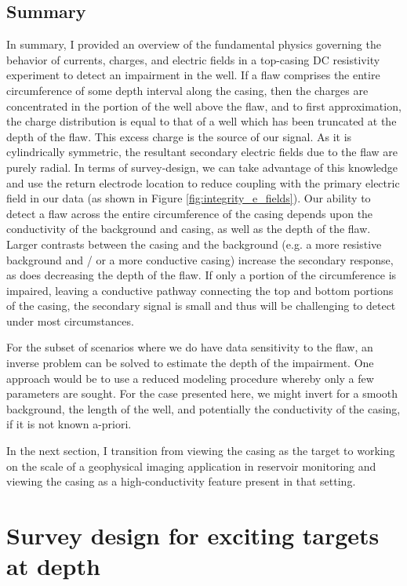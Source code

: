 

\subsection{Summary}
In summary, I provided an overview of the fundamental physics governing the behavior of currents, charges, and electric fields in a top-casing DC resistivity experiment to detect an impairment in the well. If a flaw comprises the entire circumference of some depth interval along the casing, then the charges are concentrated in the portion of the well above the flaw, and to first approximation, the charge distribution is equal to that of a well which has been truncated at the depth of the flaw. This excess charge is the source of our signal. As it is cylindrically symmetric, the resultant secondary electric fields due to the flaw are purely radial. In terms of survey-design, we can take advantage of this knowledge and use the return electrode location to reduce coupling with the primary electric field in our data (as shown in Figure \ref{fig:integrity_e_fields}). Our ability to detect a flaw across the entire circumference of the casing depends upon the conductivity of the background and casing, as well as the depth of the flaw. Larger contrasts between the casing and the background (e.g. a more resistive background and / or a more conductive casing) increase the secondary response, as does decreasing the depth of the flaw. If only a portion of the circumference is impaired, leaving a conductive pathway connecting the top and bottom portions of the casing, the secondary signal is small and thus will be challenging to detect under most circumstances.

For the subset of scenarios where we do have data sensitivity to the flaw, an inverse problem can be solved to  estimate the depth of the impairment. One approach would be to use a reduced modeling procedure whereby only a few parameters are sought. For the case presented here, we might invert for a smooth background, the length of the well, and potentially the conductivity of the casing, if it is not known a-priori.

In the next section, I transition from viewing the casing as the target to working on the scale of a geophysical imaging application in reservoir monitoring and viewing the casing as a high-conductivity feature present in that setting.

\section{Survey design for exciting targets at depth}
\label{sec:survey_design}

